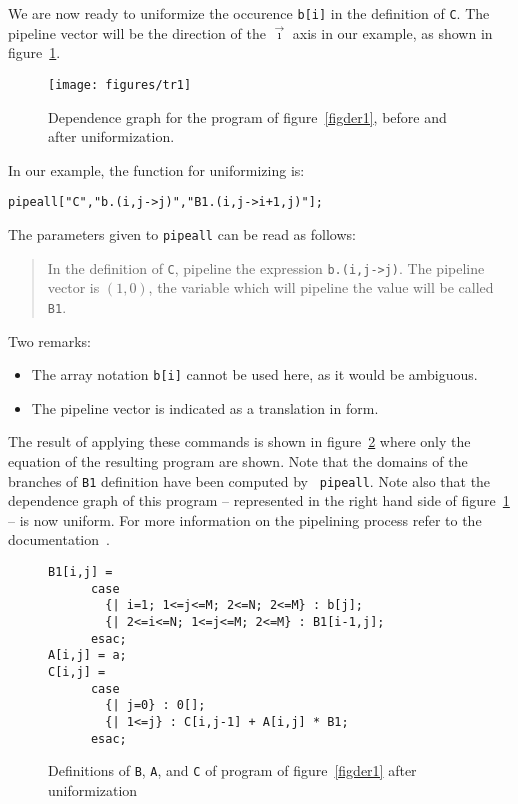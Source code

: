 We are now ready to uniformize the occurence \texttt{b[i]}
in the definition of \texttt{C}. 
The pipeline vector will be the direction of
the $\vec{\imath}$ axis in our example, as shown in 
figure~\ref{figder2}.

\begin{figure}[htbp]
\centerline{\texttt{[image: figures/tr1]}}
\caption{Dependence graph for the program of figure~\ref{figder1}, before 
and after uniformization.}
\label{figder2}
\end{figure}

In our example, the {\mmalfa} function for uniformizing is: 
\begin{verbatim}
pipeall["C","b.(i,j->j)","B1.(i,j->i+1,j)"];
\end{verbatim}
The parameters given to 
{\tt pipeall} can be read as follows: 
\begin{quote}
In the definition of {\tt C},
pipeline the expression
{\tt  b.(i,j->j)}. The pipeline vector is
$(1,0)$, the variable which will pipeline the value will be called
{\tt B1}.
\end{quote}
Two remarks: 
\begin{itemize}
\item The array notation {\tt b[i]} cannot be used
here, as it would be ambiguous. 
\item The pipeline vector is indicated as a translation in
{\alfa} form.  
\end{itemize}
The result of applying these commands is shown in
figure~\ref{figder3} where only the equation of the resulting {\alfa}
program are shown.  Note that the domains of the branches
of \texttt{B1} definition have been computed by {\tt
pipeall}. Note also that the dependence graph of this program
-- represented in the right hand side of figure~\ref{figder2} -- is
now uniform. For more information on the pipelining process refer
to the
documentation~\cite{docpipeline}.

\begin{figure}[htbp]
\begin{verbatim}
B1[i,j] = 
      case
        {| i=1; 1<=j<=M; 2<=N; 2<=M} : b[j];
        {| 2<=i<=N; 1<=j<=M; 2<=M} : B1[i-1,j];
      esac;
A[i,j] = a;
C[i,j] = 
      case
        {| j=0} : 0[];
        {| 1<=j} : C[i,j-1] + A[i,j] * B1;
      esac;
\end{verbatim}
\caption{Definitions of \texttt{B}, \texttt{A}, and \texttt{C}
of program of figure~\ref{figder1} after uniformization}
\label{figder3}
\end{figure}

